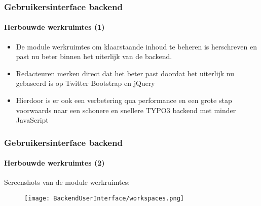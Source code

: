 \begin{frame}[fragile]
	\frametitle{Gebruikersinterface backend}
	\framesubtitle{Herbouwde werkruimtes (1)}

	\begin{itemize}

		\item De module werkruimtes om klaarstaande inhoud te beheren is herschreven
			en past nu beter binnen het uiterlijk van de backend.

		\item Redacteuren merken direct dat het beter past doordat het uiterlijk nu
		 	gebaseerd is op Twitter Bootstrap en jQuery

		\item Hierdoor is er ook een verbetering qua performance en een grote stap
		 	voorwaards naar een schonere en snellere TYPO3 backend met minder JavaScript

	\end{itemize}

\end{frame}

\begin{frame}[fragile]
	\frametitle{Gebruikersinterface backend}
	\framesubtitle{Herbouwde werkruimtes (2)}

	Screenshots van de module werkruimtes:

	\begin{figure}
		\texttt{[image: BackendUserInterface/workspaces.png]}
	\end{figure}

\end{frame}

